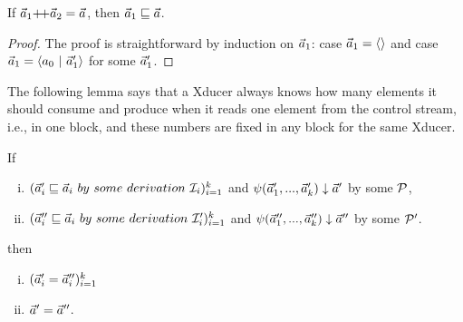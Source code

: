 \begin{lem}\label{lem-app2pre}
	If $\a_1 {\++} \a_2 = \a$, then $\vec a_1 \sqsubseteq \vec a$.
\end{lem}
\begin{proof}
	The proof is straightforward by induction on $\vec a_1$: case $\vec a_1 = \langle \rangle$ and case $ \a_1 = \< a_0 \ | \ \a_1' \'>$ for some $\vec a_1'$.
\end{proof}

The following lemma says that a Xducer always knows how many elements it should consume and produce when it reads one element from the control stream, i.e., in one block, and these numbers are fixed in any block for the same Xducer.


\begin{lem} \label{lem-block-unique}
	If
	\begin{enumerate}[(i)]
		\item $(\a_i' \prefix  \a_i \ by \ some \ derivation \ \MI_{i})^k_{i=1}$ and ${\psi}(\vec a_1',...,\vec a_k') \downarrow \vec a'$ by some $\mathcal{P}$, 
		\item $(\a_i'' \prefix \a_i \ by \ some \ derivation \ \MI'_{i})^k_{i=1}$ and
		${\psi}(\vec a_1'',...,\vec a_k'') \downarrow \vec a''$ by some $\mathcal{P}'$.
	\end{enumerate} 
	then \begin{enumerate}[(i)]
		\item $(\vec a_i' = \vec a_i'')^k_{i=1}$ 
		\item $\vec a' = \vec a''$.
	\end{enumerate}
\end{lem}

